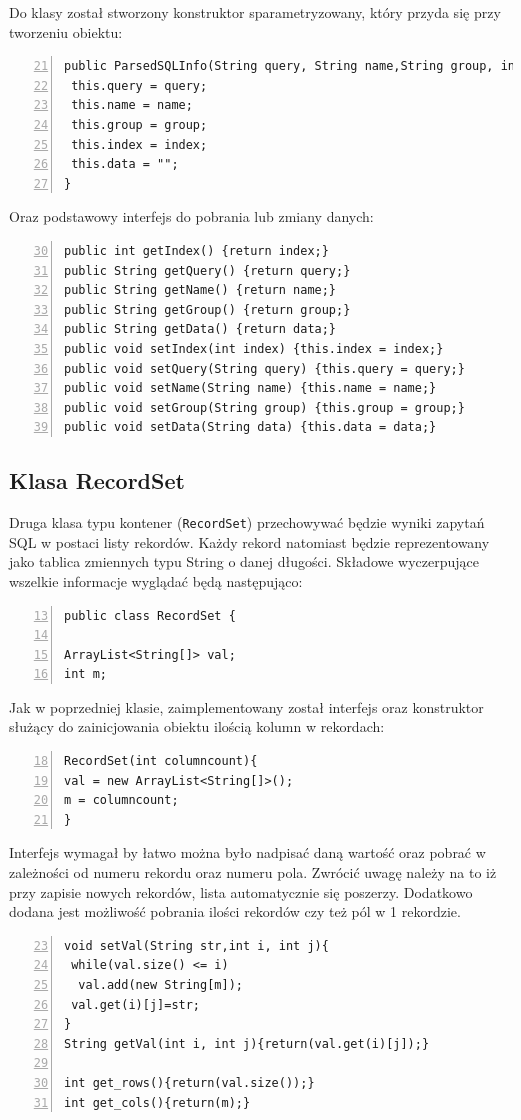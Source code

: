 Do klasy został stworzony konstruktor sparametryzowany, który przyda się przy tworzeniu obiektu:
   
\begin{lstlisting}[numbers=left,firstnumber=21]
public ParsedSQLInfo(String query, String name,String group, int index) {
 this.query = query;
 this.name = name;
 this.group = group;
 this.index = index;
 this.data = "";
}
\end{lstlisting}

Oraz podstawowy interfejs do  pobrania lub zmiany danych:
\begin{lstlisting}[numbers=left,firstnumber=30]
public int getIndex() {return index;}
public String getQuery() {return query;}
public String getName() {return name;}
public String getGroup() {return group;}
public String getData() {return data;}
public void setIndex(int index) {this.index = index;}
public void setQuery(String query) {this.query = query;}
public void setName(String name) {this.name = name;}
public void setGroup(String group) {this.group = group;}
public void setData(String data) {this.data = data;}
\end{lstlisting}

\subsection{Klasa RecordSet}
Druga klasa typu kontener (\texttt{RecordSet}) przechowywać będzie wyniki zapytań SQL w postaci listy rekordów. Każdy rekord natomiast będzie reprezentowany jako tablica zmiennych typu String o danej długości. Składowe wyczerpujące wszelkie informacje wyglądać będą następująco:

\begin{lstlisting}[numbers=left,firstnumber=13]
public class RecordSet {

ArrayList<String[]> val;
int m;
\end{lstlisting}

Jak w poprzedniej klasie, zaimplementowany został interfejs oraz konstruktor służący do zainicjowania obiektu ilością kolumn w rekordach:
 \begin{lstlisting}[numbers=left,firstnumber=18]
RecordSet(int columncount){
val = new ArrayList<String[]>();
m = columncount;
}
 \end{lstlisting}

Interfejs wymagał by łatwo można było nadpisać daną wartość oraz pobrać w zależności od numeru rekordu oraz numeru pola. Zwrócić uwagę należy na to iż przy zapisie nowych rekordów, lista automatycznie się poszerzy. Dodatkowo dodana jest możliwość pobrania ilości rekordów czy też pól w 1 rekordzie.
 \begin{lstlisting}[numbers=left,firstnumber=23]
void setVal(String str,int i, int j){
 while(val.size() <= i)
  val.add(new String[m]);
 val.get(i)[j]=str;
}
String getVal(int i, int j){return(val.get(i)[j]);}   

int get_rows(){return(val.size());}
int get_cols(){return(m);}
\end{lstlisting}

